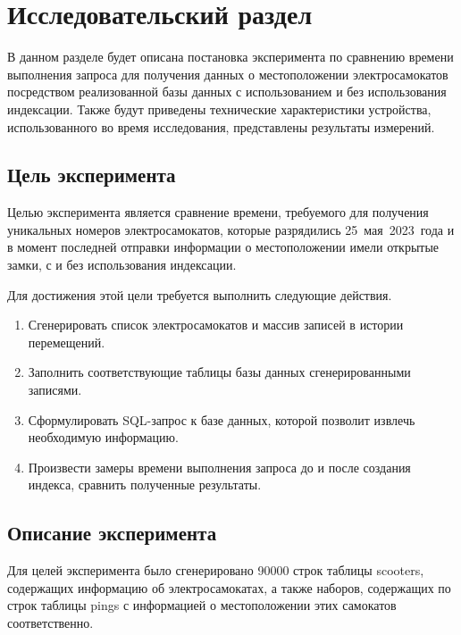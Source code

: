 \chapter{Исследовательский раздел}

В данном разделе будет описана постановка эксперимента по сравнению времени выполнения запроса для получения данных о местоположении электросамокатов посредством реализованной базы данных с использованием и без использования индексации. Также будут приведены технические характеристики устройства, использованного во время исследования, представлены результаты измерений.

\section{Цель эксперимента}

Целью эксперимента является сравнение времени, требуемого для получения уникальных номеров электросамокатов, которые разрядились 25~мая~2023~года и в момент последней отправки информации о местоположении имели открытые замки, с и без использования индексации.

Для достижения этой цели требуется выполнить следующие действия.

\begin{enumerate}
    \item Сгенерировать список электросамокатов и массив записей в истории перемещений.
    \item Заполнить соответствующие таблицы базы данных сгенерированными записями.
    \item Сформулировать SQL-запрос к базе данных, которой позволит извлечь необходимую информацию.
    \item Произвести замеры времени выполнения запроса до и после создания индекса, сравнить полученные результаты.
\end{enumerate}

\section{Описание эксперимента}


Для целей эксперимента было сгенерировано \num[round-precision=0]{90000} строк таблицы scooters, содержащих информацию об электросамокатах, а также  наборов, содержащих по  строк таблицы pings с информацией о местоположении этих самокатов соответственно.

